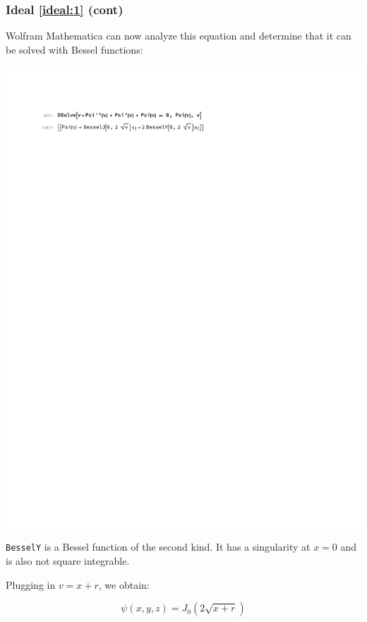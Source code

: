\documentclass{beamer}
\begin{document}
\begin{frame}
\frametitle{Ideal \eqref{ideal:1} (cont)}

Wolfram Mathematica can now
analyze this equation and determine that it can be solved with Bessel functions:

\includegraphics[page=1, clip, trim=1in 9in 1in 0.5in, width=\textwidth]{find Bessel solution.pdf}

{\tt BesselY} is a Bessel function of the second kind.  It has a singularity at $x=0$ and is also not square integrable.

\vskip 12pt

Plugging in $v=x+r$, we obtain:

\[ \psi(x,y,z) = J_0(2\sqrt{x+r}) \]
\end{frame}
\end{document}
